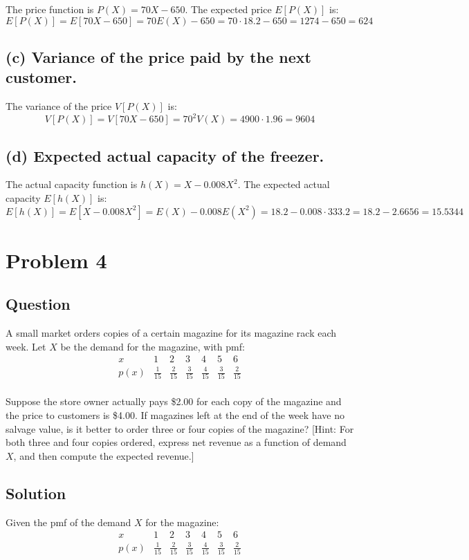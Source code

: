 \documentclass{article}
\begin{document}
The price function is \(P(X) = 70X - 650\). The expected price \(E[P(X)]\) is:
\[
E[P(X)] = E[70X - 650] = 70E(X) - 650 = 70 \cdot 18.2 - 650 = 1274 - 650 = 624
\]

\subsection*{(c) Variance of the price paid by the next customer.}

The variance of the price \(V[P(X)]\) is:
\[
V[P(X)] = V[70X - 650] = 70^2 V(X) = 4900 \cdot 1.96 = 9604
\]

\subsection*{(d) Expected actual capacity of the freezer.}

The actual capacity function is \(h(X) = X - 0.008X^2\). The expected actual capacity \(E[h(X)]\) is:
\[
E[h(X)] = E[X - 0.008X^2] = E(X) - 0.008E(X^2) = 18.2 - 0.008 \cdot 333.2 = 18.2 - 2.6656 = 15.5344
\]

\section*{Problem 4}
\subsection*{Question}
A small market orders copies of a certain magazine for its magazine rack each week. Let \(X\) be the demand for the magazine, with pmf:
\[
\begin{array}{c|cccccc}
x & 1 & 2 & 3 & 4 & 5 & 6 \\
\hline
p(x) & \frac{1}{15} & \frac{2}{15} & \frac{3}{15} & \frac{4}{15} & \frac{3}{15} & \frac{2}{15} \\
\end{array}
\]

Suppose the store owner actually pays \$2.00 for each copy of the magazine and the price to customers is \$4.00. If magazines left at the end of the week have no salvage value, is it better to order three or four copies of the magazine? [Hint: For both three and four copies ordered, express net revenue as a function of demand \(X\), and then compute the expected revenue.]


\subsection*{Solution}
Given the pmf of the demand \(X\) for the magazine:
\[
\begin{array}{c|cccccc}
x & 1 & 2 & 3 & 4 & 5 & 6 \\
\hline
p(x) & \frac{1}{15} & \frac{2}{15} & \frac{3}{15} & \frac{4}{15} & \frac{3}{15} & \frac{2}{15} \\
\end{array}
\]
\end{document}
